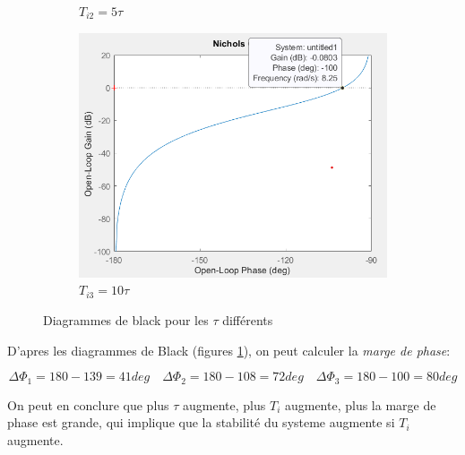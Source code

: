 \documentclass[12pt, a4paper]{report}
\begin{document}
\begin{figure}[H]
\begin{subfigure}[h!]{0.46\linewidth}
        \caption{$T_{i2} = 5\tau$}
    \end{subfigure}    
    \hfill
    \begin{subfigure}[h!]{0.46\linewidth}
        \includegraphics[width=\linewidth]{diagrammblacks1tau10.png}
        \caption{$T_{i3} = 10\tau$}
    \end{subfigure}
    \caption{Diagrammes de black pour les $\tau$ différents}
    \label{fig:diagrammblacks}
\end{figure}

D'apres les diagrammes de Black (figures \ref{fig:diagrammblacks}), on peut calculer la \textit{marge de phase}:

\[
    \Delta \Phi_1 = 180 - 139 = 41 deg \quad  \Delta \Phi_2 = 180 - 108 = 72 deg \quad \Delta \Phi_3 = 180 - 100 = 80 deg 
\]

On peut en conclure que plus $\tau$ augmente, plus $T_i$ augmente, plus la marge de phase est grande,
qui implique que la stabilité du systeme augmente si $T_i$ augmente.
\end{document}
